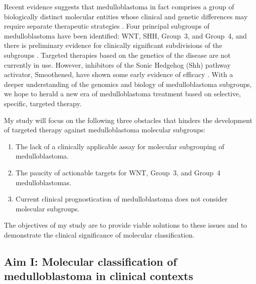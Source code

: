 \documentclass[11pt,letterpaper]{article}
\theoremstyle{definition}
\begin{document}
Recent evidence suggests that medulloblastoma in fact comprises a group of biologically distinct molecular entities whose clinical and genetic differences may require separate therapeutic strategies . Four principal subgroups of medulloblastoma have been identified: WNT, SHH, Group~3, and Group~4, and there is preliminary evidence for clinically significant subdivisions of the subgroups . Targeted therapies based on the genetics of the disease are not currently in use. However, inhibitors of the Sonic Hedgehog (Shh) pathway activator, Smoothened, have shown some early evidence of efficacy . With a deeper understanding of the genomics and biology of medulloblastoma subgroups, we hope to herald a new era of medulloblastoma treatment based on selective, specific, targeted therapy.

My study will focus on the following three obstacles that hinders the development of targeted therapy against medulloblastoma molecular subgroups:

\begin{enumerate}
	\item The lack of a clinically applicable assay for molecular subgrouping of medulloblastoma.
	\item The paucity of actionable targets for WNT, Group~3, and Group~4 medulloblastomas.
	\item Current clinical prognostication of medulloblastoma does not consider molecular subgroups.
\end{enumerate}

The objectives of my study are to provide viable solutions to these issues and to demonstrate the clinical significance of molecular classification.


\subsection{Aim I: Molecular classification of medulloblastoma in clinical contexts}
\end{document}
